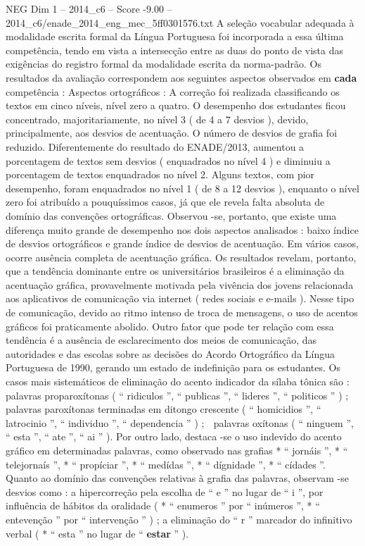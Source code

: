 \begin{textsample}{NEG Dim 1 – 2014\_c6 – Score -9.00 – 2014\_c6/enade\_2014\_eng\_mec\_5ff0301576.txt}
A seleção vocabular adequada à modalidade escrita formal da Língua Portuguesa foi incorporada a essa última competência, tendo em vista a intersecção entre as duas do ponto de vista das exigências do registro formal da modalidade escrita da norma-padrão.
Os resultados da avaliação correspondem aos seguintes aspectos observados em \textbf{cada} competência : Aspectos ortográficos : A correção foi realizada classificando os textos em cinco níveis, nível zero a quatro.
O desempenho dos estudantes ficou concentrado, majoritariamente, no nível 3 ( de 4 a 7 desvios ), devido, principalmente, aos desvios de acentuação.
O número de desvios de grafia foi reduzido.
Diferentemente do resultado do ENADE/2013, aumentou a porcentagem de textos sem desvios ( enquadrados no nível 4 ) e diminuiu a porcentagem de textos enquadrados no nível 2.
Alguns textos, com pior desempenho, foram enquadrados no nível 1 ( de 8 a 12 desvios ), enquanto o nível zero foi atribuído a pouquíssimos casos, já que ele revela falta absoluta de domínio das convenções ortográficas.
Observou -se, portanto, que existe uma diferença muito grande de desempenho nos dois aspectos analisados : baixo índice de desvios ortográficos e grande índice de desvios de acentuação.
Em vários casos, ocorre ausência completa de acentuação gráfica.
Os resultados revelam, portanto, que a tendência dominante entre os universitários brasileiros é a eliminação da acentuação gráfica, provavelmente motivada pela vivência dos jovens relacionada aos aplicativos de comunicação via internet ( redes sociais e e-mails ).
Nesse tipo de comunicação, devido ao ritmo intenso de troca de mensagens, o uso de acentos gráficos foi praticamente abolido.
Outro fator que pode ter relação com essa tendência é a ausência de esclarecimento dos meios de comunicação, das autoridades e das escolas sobre as decisões do Acordo Ortográfico da Língua Portuguesa de 1990, gerando um estado de indefinição para os estudantes.
Os casos mais sistemáticos de eliminação do acento indicador da sílaba tônica são :  palavras proparoxítonas ( “ ridiculos ”, “ publicas ”, “ lideres ”, “ politicos ” ) ;  palavras paroxítonas terminadas em ditongo crescente ( “ homicidios ”, “ latrocinio ”, “ individuo ”, “ dependencia ” ) ;  palavras oxítonas ( “ ninguem ”, “ esta ”, “ ate ”, “ ai ” ).
Por outro lado, destaca -se o uso indevido do acento gráfico em determinadas palavras, como observado nas grafias * “ jornáis ”, * “ telejornaís ”, * “ propíciar ”, * “ medídas ”, * “ dígnidade ”, * “ cídades ”.
Quanto ao domínio das convenções relativas à grafia das palavras, observam -se desvios como : a hipercorreção pela escolha de “ e ” no lugar de “ i ”, por influência de hábitos da oralidade ( * “ enumeros ” por “ inúmeros ”, * “ entevenção ” por “ intervenção ” ) ; a eliminação do “ r ” marcador do infinitivo verbal ( * “ esta ” no lugar de “ \textbf{estar} ” ).

\end{textsample}
